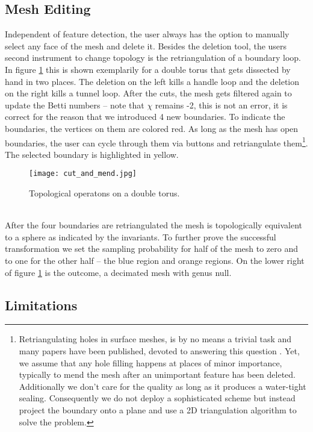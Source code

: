 \subsection{Mesh Editing}
\label{topstoc22}

Independent of feature detection, the user always has the option to manually select any face of the mesh and delete it.
Besides the deletion tool, the users second instrument to change topology is the retriangulation of a boundary loop.\\
In figure \ref{fig:cut_and_mend} this is shown exemplarily for a double torus that gets dissected by hand in two places.
The deletion on the left kills a handle loop and the deletion on the right kills a tunnel loop.
After the cuts, the mesh gets filtered again to update the Betti numbers -- note that $\chi$ remains -2, this is not an error, it is correct for the reason that we introduced 4 new boundaries.
To indicate the boundaries, the vertices on them are colored red.
As long as the mesh has open boundaries, the user can cycle through them via buttons and retriangulate them\footnote{ Retriangulating holes in surface meshes, is by no means a trivial task and many papers have been published, devoted to answering this question \citep[cf.][]{Zhao2007}. Yet, we assume that any hole filling happens at places of minor importance, typically to mend the mesh after an unimportant feature has been deleted. Additionally we don't care for the quality as long as it produces a water-tight sealing. Consequently we do not deploy a sophisticated scheme but instead project the boundary onto a plane and use a 2D triangulation algorithm to solve the problem.}.
The selected boundary is highlighted in yellow.\\
\begin{figure}[ht]
\centering
\texttt{[image: cut\_and\_mend.jpg]}
\caption{Topological operatons on a double torus.}
\label{fig:cut_and_mend}
\end{figure}\\
After the four boundaries are retriangulated the mesh is topologically equivalent to a sphere as indicated by the invariants.
To further prove the successful transformation we set the sampling probability for half of the mesh to zero and to one for the other half -- the blue region and orange regions.
On the lower right of figure \ref{fig:cut_and_mend} is the outcome, a decimated mesh with genus null.

\newpage
\subsection{Limitations}
\label{topstoc23}

